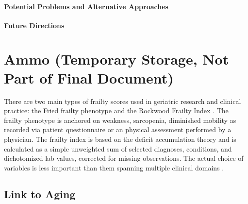 \paragraph{Potential Problems and Alternative
      Approaches}\label{potential-problems-and-alternative-approaches}

\paragraph{Future Directions}\label{future-directions} 
    
\section{Ammo (Temporary Storage, Not Part of Final Document)}\label{ammo}
There are two main types of frailty scores used in geriatric research and clinical practice: the Fried frailty phenotype \cite{Fried_2001} and the Rockwood Frailty Index \cite{Mitnitski_2001}. The frailty phenotype is anchored on weakness, sarcopenia, diminished mobility as recorded via patient questionnaire or an physical assessment performed by a physician. The frailty index is based on the deficit accumulation theory and is calculated as a simple unweighted sum of selected diagnoses, conditions, and dichotomized lab values, corrected for missing observations. The actual choice of variables is less important than them spanning multiple clinical domains \cite{Searle_2008}. 

\subsection{Link to Aging}\label{link-to-aging}

